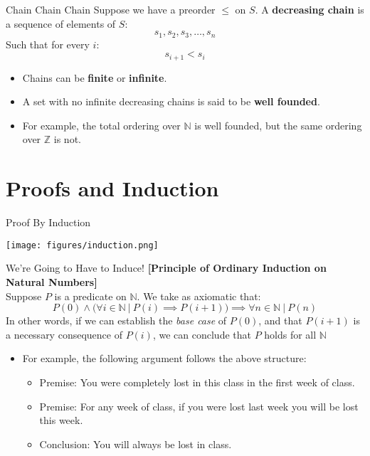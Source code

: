 \documentclass[11pt]{beamer}
\begin{document}
\begin{frame}{Chain Chain Chain}
Suppose we have a preorder $\leq$ on $S$.  A \textbf{decreasing chain} is a sequence of elements of $S$:
\begin{equation}
s_1, s_2, s_3, \dots , s_n
\end{equation}
Such that for every $i$: 
\begin{equation}
s_{i+1} < s_i
\end{equation}
\begin{itemize}
\item Chains can be \textbf{finite} or \textbf{infinite}.  
\item A set with no infinite decreasing chains is said to be \textbf{well founded}.  
\item For example, the total ordering over $\mathbb{N}$ is well founded, but the same ordering over $\mathbb{Z}$ is not.   
\end{itemize}
\end{frame}

\section[Induction]{Proofs and Induction}
\begin{frame}[fragile=singleslide]{Proof By Induction}
\begin{center}
\texttt{[image: figures/induction.png]}
\end{center}
\end{frame}

\begin{frame}[fragile=singleslide]{We're Going to Have to Induce!}
\textbf{[Principle of Ordinary Induction on Natural Numbers]} \\
Suppose $P$ is a predicate on $\mathbb{N}$.  We take as axiomatic that:
\begin{equation}
P(0) \land ( \forall i \in \mathbb{N} \:|\: P(i) \implies P(i+1) ) \implies \forall n \in \mathbb{N} \: | \: P(n)
\end{equation}
In other words, if we can establish the \emph{base case} of $P(0)$, and that $P(i+1)$ is a necessary consequence of $P(i)$, we can conclude that $P$ holds for all $\mathbb{N}$
\begin{itemize}
\item For example, the following argument follows the above structure:
\begin{itemize}
\item Premise: You were completely lost in this class in the first week of class.
\item Premise: For any week of class, if you were lost last week you will be lost this week.
\item Conclusion: You will always be lost in class.
\end{itemize}
\end{itemize}
\end{frame}
\end{document}
